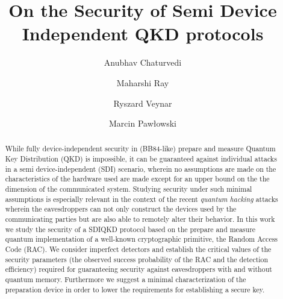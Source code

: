 \documentclass[smallextended]{svjour3}
\begin{document}
\title{On the Security of Semi Device Independent QKD protocols}



\author{Anubhav Chaturvedi \and 
        Maharshi Ray \and 
        Ryszard Veynar \and
        Marcin Paw{\l}owski}







\maketitle

\begin{abstract}
While fully device-independent security in (BB84-like) prepare and measure Quantum Key Distribution (QKD) is impossible, it can be guaranteed against individual attacks in a semi device-independent (SDI) scenario, wherein no assumptions are made on the characteristics of the hardware used are made except for an upper bound on the the dimension of the communicated system. Studying security under such minimal assumptions is especially relevant in the context of the recent {\it quantum hacking} attacks wherein the eavesdroppers can not only construct the devices used by the communicating parties but are also able to remotely alter their behavior. In this work we study the security of a SDIQKD protocol based on the prepare and measure quantum implementation of a well-known cryptographic primitive, the Random Access Code (RAC). We consider imperfect detectors and establish the critical values of the security parameters (the observed success probability of the RAC and the detection efficiency) required for guaranteeing security against eavesdroppers with and without quantum memory. Furthermore we suggest a minimal characterization of the preparation device in order to lower the requirements for establishing a secure key.
\end{abstract}
\end{document}
